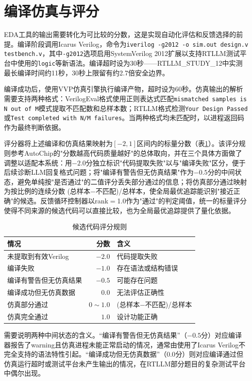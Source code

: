\section{编译仿真与评分}

EDA工具的输出需要转化为可比较的分数，这是实现自动化评估和反馈选择的前提。编译阶段调用Icarus Verilog，命令为\texttt{iverilog -g2012 -o sim.out design.v testbench.v}，其中\texttt{-g2012}选项启用SystemVerilog 2012扩展以支持RTLLM测试平台中使用的\texttt{logic}等新语法。编译超时设为30秒——RTLLM\_STUDY\_12中实测最长编译时间约11秒，30秒上限留有约2.7倍安全边界。

编译成功后，使用VVP仿真引擎执行编译产物，超时设为60秒。仿真输出的解析需要支持两种格式：VerilogEval格式使用正则表达式匹配\texttt{mismatched samples is N out of M}模式提取不匹配数和总样本数；RTLLM格式检测\texttt{Your Design Passed}或\texttt{Test completed with N/M failures}。当两种格式均未匹配时，以进程返回码作为最终判断依据。

评分器将上述编译和仿真结果映射为$[-2, 1]$区间内的标量分数（表\ref{tab:rank_score}）。该评分规则参考AutoChip\cite{autochip}的"分数越高代码质量越好"的总体取向，并在三个具体方面做了调整以适配本系统：用$-2.0$分独立标识"代码提取失败"以与"编译失败"区分，便于后续诊断LLM回复格式问题；将"编译有警告但无仿真结果"作为$-0.5$分的中间状态，避免单纯按"是否通过"的二值评分丢失部分通过的信息；将仿真部分通过映射为按比例的连续分数 (总样本$-$不匹配)/总样本，使全局最优追踪能识别"接近正确"的候选。反馈循环控制器以rank$=$1.0作为"通过"的判定阈值，统一的标量评分使得不同来源的候选代码可以直接比较，也为全局最优追踪提供了量化依据。

\begin{table}[htbp]
\centering
\caption{候选代码评分规则}
\label{tab:rank_score}
\begin{tabular}{lrl}
\toprule
情况 & 分数 & 含义 \\
\midrule
未提取到有效Verilog & $-2.0$ & 代码提取失败 \\
编译失败 & $-1.0$ & 存在语法或结构错误 \\
编译有警告但无仿真结果 & $-0.5$ & 可能存在问题 \\
编译成功但无仿真数据 & $0.0$ & 无法评估正确性 \\
仿真部分通过 & $0 \sim 1.0$ & (总样本$-$不匹配)/总样本 \\
仿真完全通过 & $1.0$ & 设计功能正确 \\
\bottomrule
\end{tabular}
\end{table}

需要说明两种中间状态的含义。``编译有警告但无仿真结果''（$-0.5$分）对应编译器报告了warning且仿真进程未能正常启动的情况，通常由使用了Icarus Verilog不完全支持的语法特性引起。``编译成功但无仿真数据''（$0.0$分）则对应编译通过但仿真运行超时或测试平台未产生输出的情况，在RTLLM部分题目的复杂测试平台中偶尔出现。

